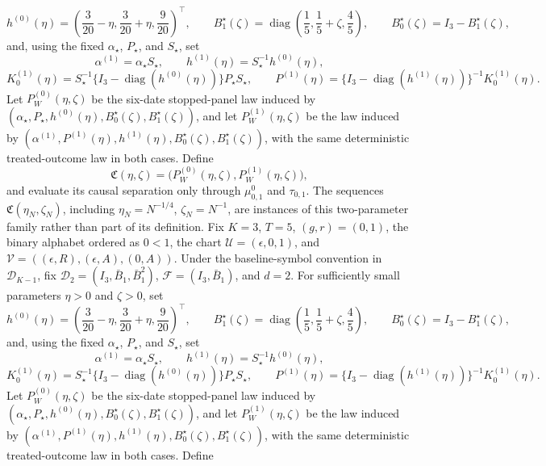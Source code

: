 \[
 h^{(0)}(\eta)=\left(\frac3{20}-\eta,\frac3{20}+\eta,\frac9{20}\right)^{\top},
 \qquad
 B_1^{\star}(\zeta)=\operatorname{diag}\left(\frac15,\frac15+\zeta,\frac45\right),
 \qquad B_0^{\star}(\zeta)=I_3-B_1^{\star}(\zeta),
\]
and, using the fixed \(\alpha_{\star}\), \(P_{\star}\), and \(S_{\star}\), set
\[
 \alpha^{(1)}=\alpha_{\star}S_{\star},\qquad
 h^{(1)}(\eta)=S_{\star}^{-1}h^{(0)}(\eta),
\]
\[
 K_0^{(1)}(\eta)=S_{\star}^{-1}
 \{I_3-\operatorname{diag}(h^{(0)}(\eta))\}P_{\star}S_{\star},
 \qquad
 P^{(1)}(\eta)=\{I_3-\operatorname{diag}(h^{(1)}(\eta))\}^{-1}K_0^{(1)}(\eta).
\]
Let \(P_W^{(0)}(\eta,\zeta)\) be the six-date stopped-panel law induced by \((\alpha_{\star},P_{\star},h^{(0)}(\eta),B_0^{\star}(\zeta),B_1^{\star}(\zeta))\), and let \(P_W^{(1)}(\eta,\zeta)\) be the law induced by \((\alpha^{(1)},P^{(1)}(\eta),h^{(1)}(\eta),B_0^{\star}(\zeta),B_1^{\star}(\zeta))\), with the same deterministic treated-outcome law in both cases. Define
\[
 \mathfrak C(\eta,\zeta)=
 \bigl(P_W^{(0)}(\eta,\zeta),P_W^{(1)}(\eta,\zeta)\bigr),
\]
and evaluate its causal separation only through \(\mu^0_{0,1}\) and \(\tau_{0,1}\). The sequences \(\mathfrak C(\eta_N,\zeta_N)\), including \(\eta_N=N^{-1/4}\), \(\zeta_N=N^{-1}\), are instances of this two-parameter family rather than part of its definition.
Fix \(K=3\), \(T=5\), \((g,r)=(0,1)\), the binary alphabet ordered as \(0<1\), the chart \(\mathcal U=(\epsilon,0,1)\), and \(\mathcal V=((\epsilon,R),(\epsilon,A),(0,A))\). Under the baseline-symbol convention in \(\mathcal D_{K-1}\), fix \(\mathcal D_2=(I_3,\bar B_1,\bar B_1^2)\), \(\mathcal F=(I_3,\bar B_1)\), and \(d=2\). For sufficiently small parameters \(\eta>0\) and \(\zeta>0\), set
\[
 h^{(0)}(\eta)=\left(\frac3{20}-\eta,\frac3{20}+\eta,\frac9{20}\right)^{\top},
 \qquad
 B_1^{\star}(\zeta)=\operatorname{diag}\left(\frac15,\frac15+\zeta,\frac45\right),
 \qquad B_0^{\star}(\zeta)=I_3-B_1^{\star}(\zeta),
\]
and, using the fixed \(\alpha_{\star}\), \(P_{\star}\), and \(S_{\star}\), set
\[
 \alpha^{(1)}=\alpha_{\star}S_{\star},\qquad
 h^{(1)}(\eta)=S_{\star}^{-1}h^{(0)}(\eta),
\]
\[
 K_0^{(1)}(\eta)=S_{\star}^{-1}
 \{I_3-\operatorname{diag}(h^{(0)}(\eta))\}P_{\star}S_{\star},
 \qquad
 P^{(1)}(\eta)=\{I_3-\operatorname{diag}(h^{(1)}(\eta))\}^{-1}K_0^{(1)}(\eta).
\]
Let \(P_W^{(0)}(\eta,\zeta)\) be the six-date stopped-panel law induced by \((\alpha_{\star},P_{\star},h^{(0)}(\eta),B_0^{\star}(\zeta),B_1^{\star}(\zeta))\), and let \(P_W^{(1)}(\eta,\zeta)\) be the law induced by \((\alpha^{(1)},P^{(1)}(\eta),h^{(1)}(\eta),B_0^{\star}(\zeta),B_1^{\star}(\zeta))\), with the same deterministic treated-outcome law in both cases. Define

